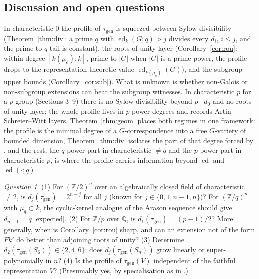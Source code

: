 \documentclass[11pt]{amsart}
\theoremstyle{definition}
\theoremstyle{remark}
\newtheorem{question}[theorem]{Question}
\newcommand{\ed}{\operatorname{ed}}
\newcommand{\gen}{\mathrm{gen}}
\newcommand{\Z}{\mathbb Z}
\newcommand{\Q}{\mathbb Q}
\begin{document}
\subsection{Discussion and open questions}
In characteristic $0$ the profile of $\tau_\gen$ is squeezed between Sylow
divisibility (Theorem~\ref{thm:div}: a prime $q$ with $\ed_k(G;q)>j$ divides every
$d_i$, $i\le j$, and the prime-to-$q$ tail is constant), the roots-of-unity layer
(Corollary~\ref{cor:rou}: within degree $[k(\mu_e):k]$, prime to $|G|$ when $|G|$ is
a prime power, the profile drops to the representation-theoretic value
$\ed_{k(\mu_e)}(G)$), and the subgroup upper bounds (Corollary~\ref{cor:sub}). What is
unknown is whether non-Galois or non-subgroup extensions can beat the subgroup
witnesses. In characteristic $p$ for a $p$-group (Sections 3--9) there is no Sylow
divisibility beyond $p\mid d_0$ and no roots-of-unity layer; the whole profile lives in
$p$-power degrees and records Artin--Schreier--Witt layers. Theorem~\ref{thm:geom}
places both regimes in one framework: the profile is the minimal degree of a
$G$-correspondence into a free $G$-variety of bounded dimension, Theorem~\ref{thm:div}
isolates the part of that degree forced by \cite[Thm.~10.1]{RS}, and the rest, the
$q$-power part in characteristic $\ne q$ and the $p$-power part in characteristic $p$,
is where the profile carries information beyond $\ed$ and $\ed(\cdot;q)$.

\begin{question}
(1) For $(\Z/2)^n$ over an algebraically closed field of characteristic $\ne2$, is
$d_j(\tau_\gen)=2^{n-j}$ for all $j$ (known for $j\in\{0,1,n-1,n\}$)? For $(\Z/q)^n$
with $\mu_q\subset k$, the cyclic-kernel analogue of the Arason sequence should give
$d_{n-1}=q$ [expected].
(2) For $\Z/p$ over $\Q$, is $d_1(\tau_\gen)=(p-1)/2$? More generally, when is
Corollary~\ref{cor:rou} sharp, and can an extension not of the form $Fk'$ do better
than adjoining roots of unity?
(3) Determine $d_2(\tau_\gen(S_6))\in\{2,4,6\}$; does $d_j(\tau_\gen(S_n))$ grow
linearly or super-polynomially in $n$?
(4) Is the profile of $\tau_\gen(V)$ independent of the faithful representation $V$?
(Presumably yes, by specialisation as in \cite{RS}.)
\end{question}
\end{document}
